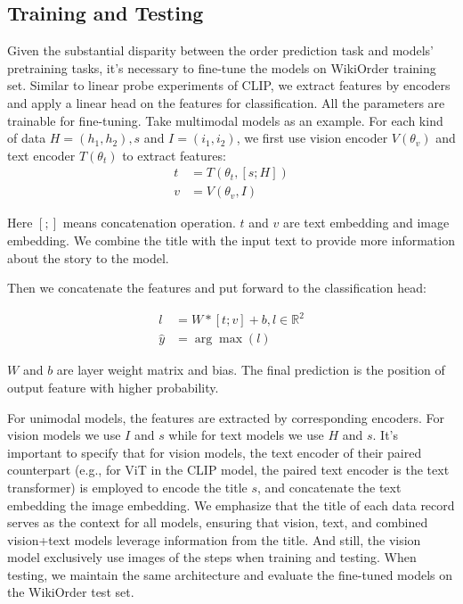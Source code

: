\documentclass[11pt]{article}
\begin{document}
\subsection{Training and Testing}
Given the substantial disparity between the order prediction task and models' pretraining tasks, it's necessary to fine-tune the models on WikiOrder training set. Similar to linear probe experiments of CLIP, we extract features by encoders and apply a linear head on the features for classification. All the parameters are trainable for fine-tuning. Take multimodal models as an example. For each kind of data $H=(h_1,h_2), s$ and $I=(i_1,i_2)$, we first use vision encoder $V(\theta_v)$ and text encoder $T(\theta_t)$ to extract features:
\begin{equation}
\begin{split}
    t &= T(\theta_t,[s;H])\\
    v &= V(\theta_v,I)
\end{split}
\end{equation}

Here $[;]$ means concatenation operation. $t$ and $v$ are text embedding and image embedding. We combine the title with the input text to provide more information about the story to the model.

Then we concatenate the features and put forward to the classification head:

\begin{equation}
\begin{split}    
    l &= W*[t;v]+b, l\in \mathbb{R}^2 \\
    \hat{y} &= \arg \max (l)
\end{split}
\end{equation}

 $W$ and $b$ are layer weight matrix and bias. The final prediction is the position of output feature with higher probability.

For unimodal models, the features are extracted by corresponding encoders. For vision models we use $I$ and $s$ while for text models we use $H$ and $s$. It's important to specify that for vision models, the text encoder of their paired counterpart (e.g., for ViT in the CLIP model, the paired text encoder is the text transformer) is employed to encode the title $s$, and concatenate the text embedding the image embedding. We emphasize that the title of each data record serves as the context for all models, ensuring that vision, text, and combined vision+text models leverage information from the title. And still, the vision model exclusively use images of the steps when training and testing. When testing, we maintain the same architecture and evaluate the fine-tuned models on the WikiOrder test set. 
\end{document}
